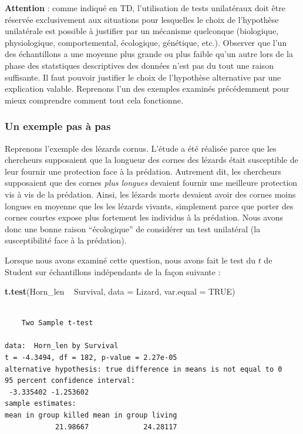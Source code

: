 \documentclass[a4paperpaper,]{article}
\newenvironment{Shaded}{\begin{snugshade}}{\end{snugshade}}
\newcommand{\DataTypeTok}[1]{\textcolor[rgb]{0.00,0.34,0.68}{#1}}
\newcommand{\KeywordTok}[1]{\textcolor[rgb]{0.12,0.11,0.11}{\textbf{#1}}}
\newcommand{\NormalTok}[1]{\textcolor[rgb]{0.12,0.11,0.11}{#1}}
\newcommand{\OperatorTok}[1]{\textcolor[rgb]{0.12,0.11,0.11}{#1}}
\newcommand{\OtherTok}[1]{\textcolor[rgb]{0.00,0.43,0.16}{#1}}
\newcommand{\StringTok}[1]{\textcolor[rgb]{0.75,0.01,0.01}{#1}}
\begin{document}
\textbf{Attention} : comme indiqué en TD, l'utilisation de tests unilatéraux doit être réservée exclusivement aux situations pour lesquelles le choix de l'hypothèse unilatérale est possible à justifier par un mécanisme quelconque (biologique, physiologique, comportemental, écologique, génétique, etc.). Observer que l'un des échantillons a une moyenne plus grande ou plus faible qu'un autre lors de la phase des statstiques descriptives des données n'est pas du tout une raison suffisante. Il faut pouvoir justifier le choix de l'hypothèse alternative par une explication valable. Reprenons l'un des exemples examinés précédemment pour mieux comprendre comment tout cela fonctionne.

\hypertarget{un-exemple-pas-uxe0-pas}{%
\subsubsection{Un exemple pas à pas}\label{un-exemple-pas-uxe0-pas}}

Reprenons l'exemple des lézards cornus. L'étude a été réalisée parce que les chercheurs supposaient que la longueur des cornes des lézards était susceptible de leur fournir une protection face à la prédation. Autrement dit, les chercheurs supposaient que des cornes \emph{plus longues} devaient fournir une meilleure protection vis à vis de la prédation. Ainsi, les lézards morts devaient avoir des cornes moins longues en moyenne que les les lézards vivants, simplement parce que porter des cornes courtes expose plus fortement les individus à la prédation. Nous avons donc une bonne raison ``écologique'' de considérer un test unilatéral (la susceptibilité face à la prédation).

Lorsque nous avons examiné cette question, nous avons fait le test du \(t\) de Student sur échantillons indépendants de la façon suivante :

\begin{Shaded}
\begin{Highlighting}[]
\KeywordTok{t.test}\NormalTok{(Horn_len }\OperatorTok{~}\StringTok{ }\NormalTok{Survival, }\DataTypeTok{data =}\NormalTok{ Lizard, }\DataTypeTok{var.equal =} \OtherTok{TRUE}\NormalTok{)}
\end{Highlighting}
\end{Shaded}

\begin{verbatim}

    Two Sample t-test

data:  Horn_len by Survival
t = -4.3494, df = 182, p-value = 2.27e-05
alternative hypothesis: true difference in means is not equal to 0
95 percent confidence interval:
 -3.335402 -1.253602
sample estimates:
mean in group killed mean in group living 
            21.98667             24.28117 
\end{verbatim}
\end{document}
